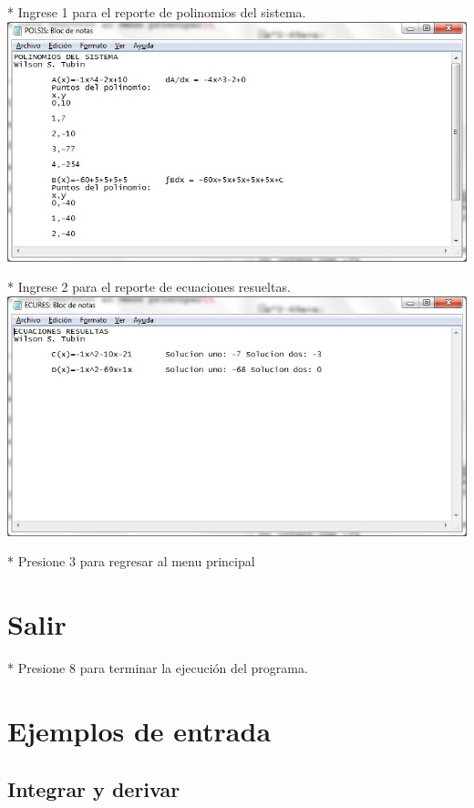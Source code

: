 \documentclass[journal]{../../IEEEtran/IEEEtran}
\begin{document}
* Ingrese 1 para el reporte de polinomios del sistema. \\

\includegraphics[scale=0.42]{img/72.jpg}

* Ingrese 2 para el reporte de ecuaciones resueltas. \\

\includegraphics[scale=0.42]{img/73.jpg}


* Presione 3 para regresar al menu principal\\

\section{Salir}

* Presione 8 para terminar la ejecución del programa.


\section{Ejemplos de entrada}

\subsection{Integrar y derivar}
\end{document}

